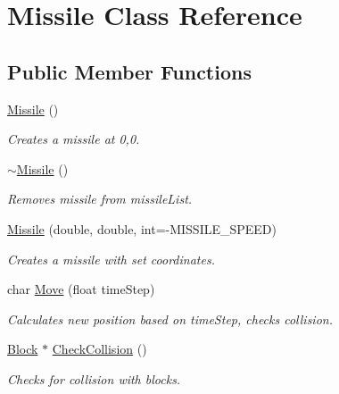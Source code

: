 \hypertarget{class_missile}{}\section{Missile Class Reference}
\label{class_missile}
\subsection*{Public Member Functions}
\begin{DoxyCompactItemize}
\item 
\mbox{\label{class_missile_aa5ce8791a8e7ebd4ea0afab390b73a1a}} 
\hyperlink{class_missile_aa5ce8791a8e7ebd4ea0afab390b73a1a}{Missile} ()
\begin{DoxyCompactList}\small\item\em Creates a missile at 0,0. \end{DoxyCompactList}\item 
\mbox{\label{class_missile_ad42379e48a46ec3556056f98ce8bd912}} 
\hyperlink{class_missile_ad42379e48a46ec3556056f98ce8bd912}{$\sim$\+Missile} ()
\begin{DoxyCompactList}\small\item\em Removes missile from missile\+List. \end{DoxyCompactList}\item 
\hyperlink{class_missile_a63dbc713a488f9920811ac24f2639968}{Missile} (double, double, int=-\/M\+I\+S\+S\+I\+L\+E\+\_\+\+S\+P\+E\+ED)
\begin{DoxyCompactList}\small\item\em Creates a missile with set coordinates. \end{DoxyCompactList}\item 
char \hyperlink{class_missile_a25babb76b7fb981142721fa02a265b31}{Move} (float time\+Step)
\begin{DoxyCompactList}\small\item\em Calculates new position based on time\+Step, checks collision. \end{DoxyCompactList}\item 
\hyperlink{class_block}{Block} $\ast$ \hyperlink{class_missile_ab0820871eedcfe00ed389785f22d4558}{Check\+Collision} ()
\begin{DoxyCompactList}\small\item\em Checks for collision with blocks. \end{DoxyCompactList}\end{DoxyCompactItemize}
